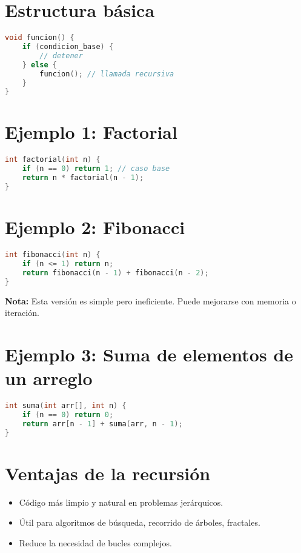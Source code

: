 \documentclass[a4paper]{article}
\begin{document}
\section{Estructura básica}

\begin{lstlisting}[language=C++]
void funcion() {
    if (condicion_base) {
        // detener
    } else {
        funcion(); // llamada recursiva
    }
}
\end{lstlisting}

\section{Ejemplo 1: Factorial}

\begin{lstlisting}[language=C++]
int factorial(int n) {
    if (n == 0) return 1; // caso base
    return n * factorial(n - 1);
}
\end{lstlisting}

\section{Ejemplo 2: Fibonacci}

\begin{lstlisting}[language=C++]
int fibonacci(int n) {
    if (n <= 1) return n;
    return fibonacci(n - 1) + fibonacci(n - 2);
}
\end{lstlisting}

\textbf{Nota:} Esta versión es simple pero ineficiente. Puede mejorarse con memoria o iteración.

\section{Ejemplo 3: Suma de elementos de un arreglo}

\begin{lstlisting}[language=C++]
int suma(int arr[], int n) {
    if (n == 0) return 0;
    return arr[n - 1] + suma(arr, n - 1);
}
\end{lstlisting}

\section{Ventajas de la recursión}

\begin{itemize}
    \item Código más limpio y natural en problemas jerárquicos.
    \item Útil para algoritmos de búsqueda, recorrido de árboles, fractales.
    \item Reduce la necesidad de bucles complejos.
\end{itemize}
\end{document}
